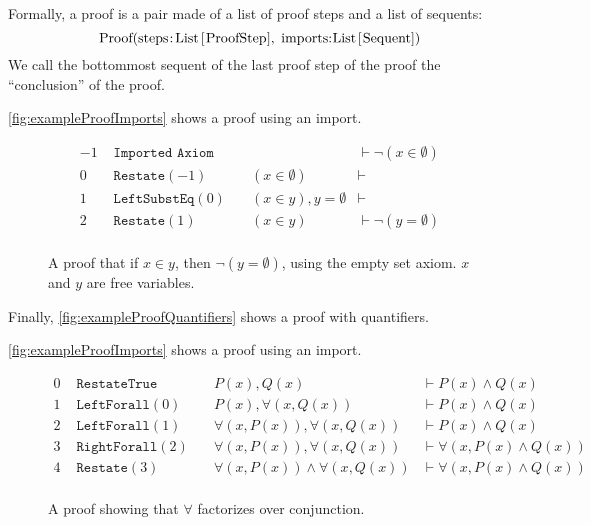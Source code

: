Formally, a proof is a pair made of a list of proof steps and a list of sequents:
$$
  \text{\lstinline{Proof(steps:List[ProofStep], imports:List[Sequent])}}
$$
We call the bottommost sequent of the last proof step of the proof the ``conclusion'' of the proof.

\autoref{fig:exampleProofImports} shows a proof using an import.
\begin{figure}[ht]
  \begin{align*}
    -1 & \texttt { Imported Axiom}                & \quad                          & \vdash \neg (x \in \emptyset)               \\
    0 & \texttt { Restate}(-1)      & \quad  (x \in \emptyset)                & \vdash                             \\
    1 & \texttt { LeftSubstEq}(0)   & \quad  (x \in y), y=\emptyset           & \vdash                             \\
    2 & \texttt { Restate}(1)       & \quad  (x \in y)           & \vdash \neg(y=\emptyset)                        \\
  \end{align*}
  \caption{A proof that if $x\in y$, then $\neg (y=\emptyset)$, using the empty set axiom. $x$ and $y$ are free variables.}
  \label{fig:exampleProofImports}
\end{figure}

\noindent
Finally, \autoref{fig:exampleProofQuantifiers} shows a proof with quantifiers.

\autoref{fig:exampleProofImports} shows a proof using an import.
\begin{figure}[ht]
  \begin{align*}
    0 & \texttt { RestateTrue}  & \quad  P(x), Q(x) & \vdash P(x) \land Q(x)   \\
    1 & \texttt { LeftForall}(0)   & \quad  P(x), \forall(x, Q(x)) & \vdash P(x) \land Q(x)   \\
    2 & \texttt { LeftForall}(1)   & \quad  \forall(x, P(x)), \forall(x, Q(x)) & \vdash P(x) \land Q(x)   \\
    3 & \texttt { RightForall}(2)  & \quad  \forall(x, P(x)),  \forall(x, Q(x)) & \vdash \forall(x, P(x) \land Q(x))   \\
    4 & \texttt { Restate}(3)  & \quad  \forall(x, P(x)) \land \forall(x, Q(x)) & \vdash \forall(x, P(x) \land Q(x))   \\
  \end{align*}
  \caption{A proof showing that $\forall$ factorizes over conjunction.}
  \label{fig:exampleProofQuantifiers}
\end{figure}

